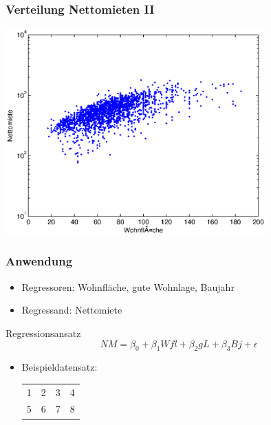 \documentclass{beamer}
\begin{document}
\begin{frame}
  \frametitle{Verteilung Nettomieten II}
  \begin{center}
    \includegraphics[width=10cm]{figures/nm_wfl_distribution_log}
  \end{center}
\end{frame}

\begin{frame}
  \frametitle{Anwendung}
  

  \begin{itemize}
  \item Regressoren: Wohnfläche, gute Wohnlage, Baujahr
  \item Regressand: Nettomiete
  \end{itemize}

  \begin{block}{Regressionsansatz}
    \begin{equation*}
      NM = \beta_0 + \beta_1 Wfl + \beta_2 gL + \beta_3 Bj + \epsilon
    \end{equation*}
  \end{block}

  \begin{itemize}
  \item Beispieldatensatz:\\
    \begin{tabular}[h]{c|c|c|c}
      1 & 2 & 3 & 4 \\
      5 & 6 & 7 & 8
    \end{tabular}
  \end{itemize}

\end{frame}
\end{document}
